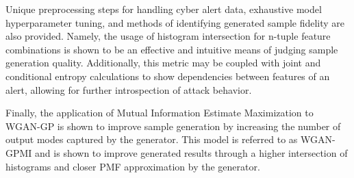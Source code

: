 Unique preprocessing steps for handling cyber alert data, exhaustive model hyperparameter tuning, and methods of identifying generated sample fidelity are also provided. Namely, the usage of histogram intersection for n-tuple feature combinations is shown to be an effective and intuitive means of judging sample generation quality. Additionally, this metric may be coupled with joint and conditional entropy calculations to show dependencies between features of an alert, allowing for further introspection of attack behavior.

Finally, the application of Mutual Information Estimate Maximization to WGAN-GP is shown to improve sample generation by increasing the number of output modes captured by the generator. This model is referred to as WGAN-GPMI and is shown to improve generated results through a higher intersection of histograms and closer PMF approximation by the generator.
